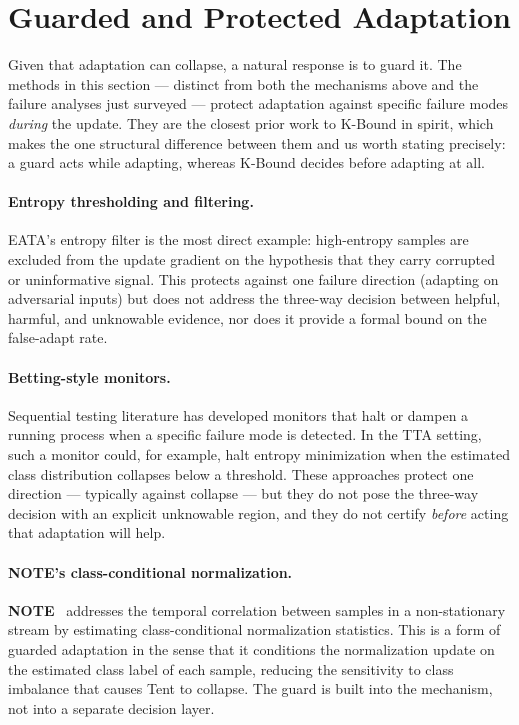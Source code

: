 \section{Guarded and Protected Adaptation}\label{sec:rel-guarded}

Given that adaptation can collapse, a natural response is to guard it. The
methods in this section --- distinct from both the mechanisms above and the
failure analyses just surveyed --- protect adaptation against specific failure
modes \emph{during} the update. They are the closest prior work to K-Bound in
spirit, which makes the one structural difference between them and us worth
stating precisely: a guard acts while adapting, whereas K-Bound decides before
adapting at all.

\paragraph{Entropy thresholding and filtering.}
EATA's entropy filter is the most direct example: high-entropy samples are
excluded from the update gradient on the hypothesis that they carry
corrupted or uninformative signal.
This protects against one failure direction (adapting on adversarial inputs)
but does not address the three-way decision between helpful, harmful, and
unknowable evidence, nor does it provide a formal bound on the false-adapt
rate.

\paragraph{Betting-style monitors.}
Sequential testing literature has developed monitors that halt or dampen a
running process when a specific failure mode is detected.
In the TTA setting, such a monitor could, for example, halt entropy
minimization when the estimated class distribution collapses below a threshold.
These approaches protect one direction --- typically against collapse --- but
they do not pose the three-way decision with an explicit unknowable region,
and they do not certify \emph{before} acting that adaptation will help.

\paragraph{NOTE's class-conditional normalization.}
\textbf{NOTE}~\cite{gong2022note} addresses the temporal correlation between
samples in a non-stationary stream by estimating class-conditional
normalization statistics.
This is a form of guarded adaptation in the sense that it conditions the
normalization update on the estimated class label of each sample, reducing
the sensitivity to class imbalance that causes Tent to collapse.
The guard is built into the mechanism, not into a separate decision layer.

